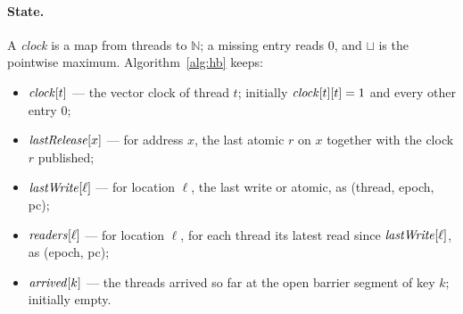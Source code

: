 \documentclass[11pt]{article}
\theoremstyle{remark}
\begin{document}
\paragraph{State.}
A \emph{clock} is a map from threads to $\mathbb{N}$; a missing entry reads
$0$, and $\sqcup$ is the pointwise maximum. Algorithm~\ref{alg:hb} keeps:
\begin{itemize}
\item $\mathit{clock}[t]$ --- the vector clock of thread $t$; initially $\mathit{clock}[t][t]=1$
      and every other entry $0$;
\item $\mathit{lastRelease}[x]$ --- for address $x$, the last atomic $r$ on $x$ together
      with the clock $r$ published;
\item $\mathit{lastWrite}[\ell]$ --- for location $\ell$, the last write or atomic, as
      (thread, epoch, pc);
\item $\mathit{readers}[\ell]$ --- for location $\ell$, for each thread its latest read
      since $\mathit{lastWrite}[\ell]$, as (epoch, pc);
\item $\mathit{arrived}[k]$ --- the threads arrived so far at the open barrier segment
      of key $k$; initially empty.
\end{itemize}
\end{document}
